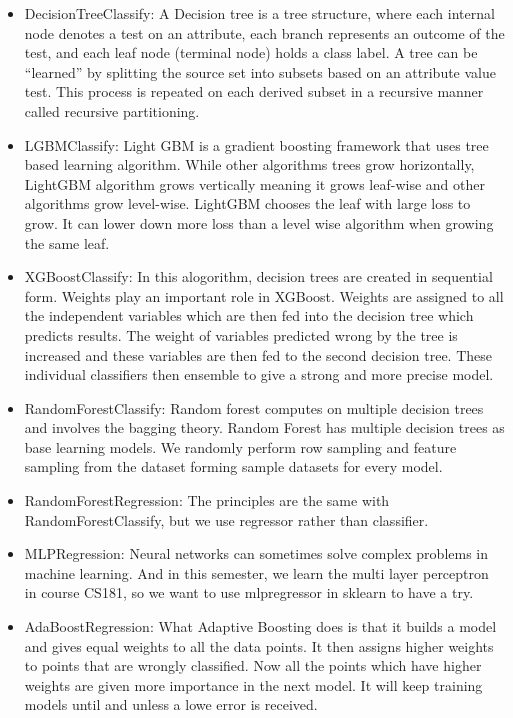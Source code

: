 \documentclass{article}
\begin{document}
\begin{itemize}
  \item DecisionTreeClassify: A Decision tree is a tree structure, where each internal node denotes a test on an attribute, each branch represents an outcome of the test, and each leaf node (terminal node) holds a class label. 
  A tree can be “learned” by splitting the source set into subsets based on an attribute value test. This process is repeated on each derived subset in a recursive manner called recursive partitioning.
  \item LGBMClassify: Light GBM is a gradient boosting framework that uses tree based learning algorithm. While other algorithms trees grow horizontally, LightGBM algorithm grows vertically meaning it grows leaf-wise and other algorithms grow level-wise. LightGBM chooses the leaf with large loss to grow. It can lower down more loss than a level wise algorithm when growing the same leaf.
  \item XGBoostClassify: In this alogorithm, decision trees are created in sequential form. Weights play an important role in XGBoost. Weights are assigned to all the independent variables which are then fed into the decision tree which predicts results. The weight of variables predicted wrong by the tree is increased and these variables are then fed to the second decision tree. These individual classifiers then ensemble to give a strong and more precise model.
  \item RandomForestClassify: Random forest computes on multiple decision trees and involves the bagging theory. Random Forest has multiple decision trees as base learning models. We randomly perform row sampling and feature sampling from the dataset forming sample datasets for every model.
  \item RandomForestRegression: The principles are the same with RandomForestClassify, but we use regressor rather than classifier.
  \item MLPRegression: Neural networks can sometimes solve complex problems in machine learning. And in this semester, we learn the multi layer perceptron in course CS181, so we want to use mlpregressor in sklearn to have a try.
  \item AdaBoostRegression: What Adaptive Boosting does is that it builds a model and gives equal weights to all the data points. It then assigns higher weights to points that are wrongly classified. Now all the points which have higher weights are given more importance in the next model. It will keep training models until and unless a lowe error is received.
\end{itemize}
\end{document}
